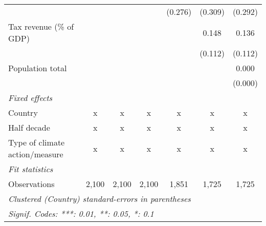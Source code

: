 \begin{tabular}{lcccccc}
                                                                     &             &         &         & (0.276)       & (0.309)      & (0.292)\\   
   Tax revenue (\% of GDP)                                           &             &         &         &               & 0.148        & 0.136\\   
                                                                     &             &         &         &               & (0.112)      & (0.112)\\   
   Population total                                                  &             &         &         &               &              & 0.000\\   
                                                                     &             &         &         &               &              & (0.000)\\   
   \emph{Fixed effects}\\
   Country                                                           & x           & x       & x       & x             & x            & x\\  
   Half decade                                                       & x           & x       & x       & x             & x            & x\\  
   Type of climate action/measure                                    & x           & x       & x       & x             & x            & x\\  
   \midrule \emph{Fit statistics}\\
   Observations                                                      & 2,100       & 2,100   & 2,100   & 1,851         & 1,725        & 1,725\\  
   \midrule
   \multicolumn{7}{l}{\emph{Clustered (Country) standard-errors in parentheses}}\\
   \multicolumn{7}{l}{\emph{Signif. Codes: ***: 0.01, **: 0.05, *: 0.1}}\\
\end{tabular}
\par\endgroup


